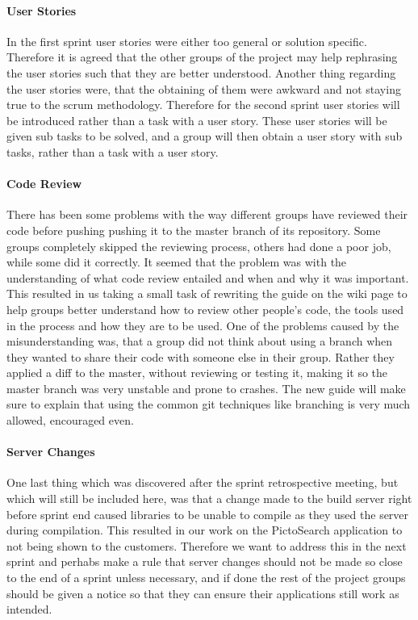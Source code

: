 \paragraph{User Stories} In the first sprint user stories were either too general or solution specific.
Therefore it is agreed that the other groups of the project may help rephrasing the user stories such that they are better understood.
Another thing regarding the user stories were, that the obtaining of them were awkward and not staying true to the scrum methodology.
Therefore for the second sprint user stories will be introduced rather than a task with a user story.
These user stories will be given sub tasks to be solved, and a group will then obtain a user story with sub tasks, rather than a task with a user story.

\paragraph{Code Review}
There has been some problems with the way different groups have reviewed their code before pushing pushing it to the master branch of its repository.
Some groups completely skipped the reviewing process, others had done a poor job, while some did it correctly.
It seemed that the problem was with the understanding of what code review entailed and when and why it was important.
This resulted in us taking a small task of rewriting the guide on the wiki page to help groups better understand how to review other people's code, the tools used in the process and how they are to be used.
One of the problems caused by the misunderstanding was, that a group did not think about using a branch when they wanted to share their code with someone else in their group.
Rather they applied a diff to the master, without reviewing or testing it, making it so the master branch was very unstable and prone to crashes.
The new guide will make sure to explain that using the common git techniques like branching is very much allowed, encouraged even.


\paragraph{Server Changes}
One last thing which was discovered after the sprint retrospective meeting, but which will still be included here, was that a change made to the build server right before sprint end caused libraries to be unable to compile as they used the server during compilation.
This resulted in our work on the PictoSearch application to not being shown to the customers.
Therefore we want to address this in the next sprint and perhabs make a rule that server changes should not be made so close to the end of a sprint unless necessary, and if done the rest of the project groups should be given a notice so that they can ensure their applications still work as intended.


